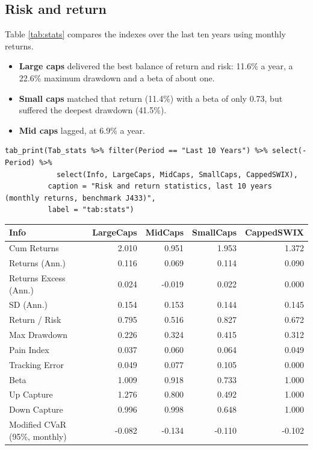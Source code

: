 \documentclass[11pt,preprint]{elsarticle}
\let\origtable\table
\let\endorigtable\endtable
\renewenvironment{table}[1][2] {
    \expandafter\origtable\expandafter[H]
} {
    \endorigtable
}
\numberwithin{equation}{section}
\numberwithin{figure}{section}
\numberwithin{table}{section}
\def\tightlist{} %
\begin{document}
\subsection{Risk and return}\label{risk-and-return}

Table \ref{tab:stats} compares the indexes over the last ten years using
monthly returns.

\begin{itemize}
\tightlist
\item
  \textbf{Large caps} delivered the best balance of return and risk:
  11.6\% a year, a 22.6\% maximum drawdown and a beta of about one.
\item
  \textbf{Small caps} matched that return (11.4\%) with a beta of only
  0.73, but suffered the deepest drawdown (41.5\%).
\item
  \textbf{Mid caps} lagged, at 6.9\% a year.
\end{itemize}

\begin{verbatim}
tab_print(Tab_stats %>% filter(Period == "Last 10 Years") %>% select(-Period) %>%
            select(Info, LargeCaps, MidCaps, SmallCaps, CappedSWIX),
          caption = "Risk and return statistics, last 10 years (monthly returns, benchmark J433)",
          label = "tab:stats")
\end{verbatim}

\begin{table}[!htbp]
\centering
\caption{Risk and return statistics, last 10 years (monthly returns, benchmark J433)} 
\label{tab:stats}
\begingroup\footnotesize
\begin{tabular}{lrrrr}
  \hline
Info & LargeCaps & MidCaps & SmallCaps & CappedSWIX \\ 
  \hline
Cum Returns & 2.010 & 0.951 & 1.953 & 1.372 \\ 
  Returns (Ann.) & 0.116 & 0.069 & 0.114 & 0.090 \\ 
  Returns Excess (Ann.) & 0.024 & -0.019 & 0.022 & 0.000 \\ 
  SD (Ann.) & 0.154 & 0.153 & 0.144 & 0.145 \\ 
  Return / Risk & 0.795 & 0.516 & 0.827 & 0.672 \\ 
  Max Drawdown & 0.226 & 0.324 & 0.415 & 0.312 \\ 
  Pain Index & 0.037 & 0.060 & 0.064 & 0.049 \\ 
  Tracking Error & 0.049 & 0.077 & 0.105 & 0.000 \\ 
  Beta & 1.009 & 0.918 & 0.733 & 1.000 \\ 
  Up Capture & 1.276 & 0.800 & 0.492 & 1.000 \\ 
  Down Capture & 0.996 & 0.998 & 0.648 & 1.000 \\ 
  Modified CVaR (95\%, monthly) & -0.082 & -0.134 & -0.110 & -0.102 \\ 
   \hline
\end{tabular}
\endgroup
\end{table}
\end{document}
